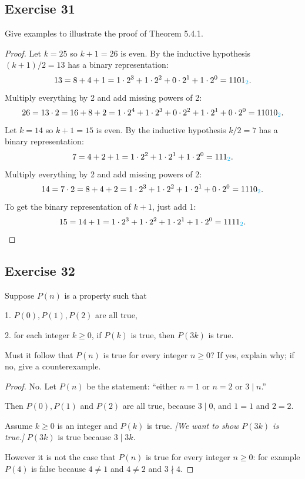 \documentclass[14pt]{extarticle}
\newcommand{\base}[1]{{\color{cyan}#1}}
\begin{document}
\subsection{Exercise 31}
Give examples to illustrate the proof of Theorem 5.4.1.

\begin{proof}
Let $k = 25$ so $k+1 = 26$ is even. By the inductive hypothesis $(k+1)/2 = 13$ has a binary representation:
\[
13 = 8 + 4 + 1 = 1 \cdot 2^3 + 1 \cdot 2^2 + 0 \cdot 2^1 + 1 \cdot 2^0 = 1101_\base{2}.
\]
Multiply everything by 2 and add missing powers of 2:
\[
26 = 13 \cdot 2 = 16 + 8 + 2 = 1 \cdot 2^4 + 1 \cdot 2^3 + 0 \cdot 2^2 + 1 \cdot 2^1 + 0 \cdot 2^0 = 11010_\base{2}.
\]
Let $k = 14$ so $k+1 = 15$ is even. By the inductive hypothesis $k/2 = 7$ has a binary representation:
\[
7 = 4 + 2 + 1 = 1 \cdot 2^2 + 1 \cdot 2^1 + 1 \cdot 2^0 = 111_\base{2}.
\]
Multiply everything by 2 and add missing powers of 2:
\[
14 = 7 \cdot 2 = 8 + 4 + 2 = 1 \cdot 2^3 + 1 \cdot 2^2 + 1 \cdot 2^1 + 0 \cdot 2^0 = 1110_\base{2}.
\]
To get the binary representation of $k+1$, just add 1:
\[
15 = 14 + 1 = 1 \cdot 2^3 + 1 \cdot 2^2 + 1 \cdot 2^1 + 1 \cdot 2^0 = 1111_\base{2}.
\]
\end{proof}

\subsection{Exercise 32}
Suppose $P(n)$ is a property such that

1. $P(0), P(1), P(2)$ are all true,

2. for each integer $k \geq 0$, if $P(k)$ is true, then
$P(3k)$ is true. 

Must it follow that $P(n)$ is true for every integer $n \geq 0$? If yes, explain why; if no, give a counterexample.

\begin{proof}
No. Let $P(n)$ be the statement: ``either $n = 1$ or $n = 2$ or $3 \mid n$.''

Then $P(0), P(1)$ and $P(2)$ are all true, because $3 \mid 0$, and $1 = 1$ and $2 = 2$.

Assume $k \geq 0$ is an integer and $P(k)$ is true. {\it [We want to show $P(3k)$ is true.]}
$P(3k)$ is true because $3 \mid 3k$.

However it is not the case that $P(n)$ is true for every integer $n \geq 0$: for example $P(4)$ is false because $4 \neq 1$ and $4 \neq 2$ and $3 \nmid 4$.
\end{proof}
\end{document}

